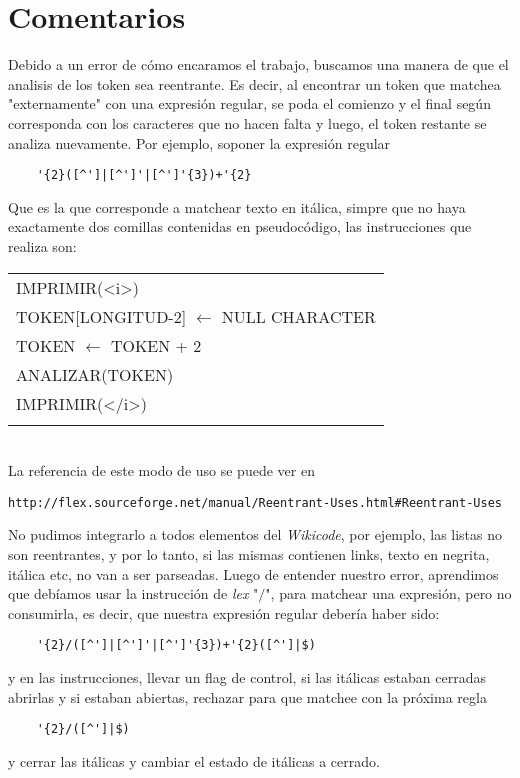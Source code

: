 \documentclass[a4paper,11pt]{article}
\begin{document}
\section{Comentarios}
Debido a un error de cómo encaramos el trabajo, buscamos una manera de que el analisis de los token sea reentrante. Es decir, al encontrar un token que matchea "externamente" con una expresión regular, se poda el comienzo y el final según corresponda con los caracteres que no hacen falta y luego, el token restante
se analiza nuevamente. Por ejemplo, soponer la expresión regular\\
\begin{center}
 \begin{verbatim}
 	'{2}([^']|[^']'|[^']'{3})+'{2}
 \end{verbatim}
\end{center}
Que es la que corresponde a matchear texto en itálica, simpre que no haya exactamente dos comillas contenidas en pseudocódigo, las instrucciones que realiza son:\\
\begin{tabular}{l}
\\
	IMPRIMIR(<i>)\\
	TOKEN[LONGITUD-2] $\longleftarrow$ NULL CHARACTER\\
	TOKEN $\longleftarrow$ TOKEN + 2\\
	ANALIZAR(TOKEN)\\
	IMPRIMIR(</i>)\\
\\	
\end{tabular}
\\La referencia de este modo de uso se puede ver en 
\begin{center}
 \begin{verbatim}
http://flex.sourceforge.net/manual/Reentrant-Uses.html#Reentrant-Uses
 \end{verbatim}
\end{center}
No pudimos integrarlo a todos elementos del \emph{Wikicode}, por ejemplo, las listas no son reentrantes, y por lo tanto, si las mismas contienen
links, texto en negrita, itálica etc, no van a ser parseadas.
Luego de entender nuestro error, aprendimos que debíamos usar la instrucción de \emph{lex} "$/$", para matchear una expresión, pero no consumirla, es decir, que nuestra expresión regular debería haber sido:
\begin{center}
 \begin{verbatim}
 	'{2}/([^']|[^']'|[^']'{3})+'{2}([^']|$)
 \end{verbatim}
\end{center}
y en las instrucciones, llevar un flag de control, si las itálicas estaban cerradas abrirlas y si estaban abiertas, rechazar para que matchee con la próxima regla
\begin{center}
 \begin{verbatim}
 	'{2}/([^']|$)
 \end{verbatim}
\end{center}
y cerrar las itálicas y cambiar el estado de itálicas a cerrado.
\end{document}
